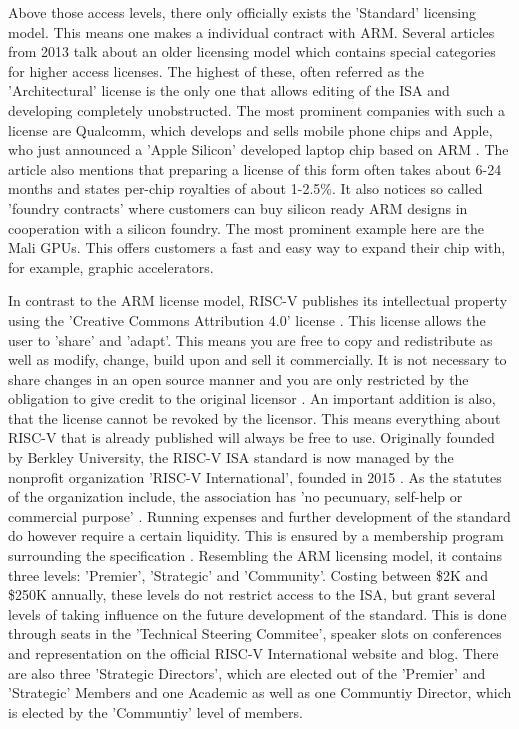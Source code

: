 \documentclass[conference]{IEEEtran}
\begin{document}
	Above those access levels, there only officially exists the 'Standard' licensing model. This means one makes a individual contract with ARM.
	Several articles from 2013 \cite{Demerjian2013}\cite{Demerjian2013a} talk about an older licensing model which contains special categories for higher access licenses. The highest of these, often referred as the 'Architectural' license is the only one that allows editing of the \gls{ISA} and developing completely unobstructed. The most prominent companies with such a license are Qualcomm, which develops and sells mobile phone chips and Apple, who just announced a 'Apple Silicon' developed laptop chip based on ARM \cite{Apple2020}. The article also mentions that preparing a license of this form often takes about 6-24 months and states per-chip royalties of about 1-2.5\%. It also notices so called 'foundry contracts' where customers can buy silicon ready ARM designs in cooperation with a silicon foundry. The most prominent example here are the Mali GPUs. This offers customers a fast and easy way to expand their chip with, for example, graphic accelerators.

	In contrast to the ARM license model, RISC-V publishes its intellectual property using the 'Creative Commons Attribution 4.0' license \cite{Waterman2017}\cite{Waterman2017a}. This license allows the user to 'share' and 'adapt'. This means you are free to copy and redistribute as well as modify, change, build upon and sell it commercially. It is not necessary to share changes in an open source manner and you are only restricted by the obligation to give credit to the original licensor \cite{CC}. An important addition is also, that the license cannot be revoked by the licensor. This means everything about RISC-V that is already published will always be free to use.
	Originally founded by Berkley University, the RISC-V \gls{ISA} standard is now managed by the nonprofit organization 'RISC-V International', founded in 2015 \cite{RVIAbout}. As the statutes of the organization include, the association has 'no pecunuary, self-help or commercial purpose' \cite{RVIArt}. Running expenses and further development of the standard do however require a certain liquidity. This is ensured by a membership program surrounding the specification \cite{RVIMem}. Resembling the ARM licensing model, it contains three levels: 'Premier', 'Strategic' and 'Community'. Costing between \$2K and \$250K annually, these levels do not restrict access to the \gls{ISA}, but grant several levels of taking influence on the future development of the standard. This is done through seats in the 'Technical Steering Commitee', speaker slots on conferences and representation on the official RISC-V International website and blog. There are also three 'Strategic Directors', which are elected out of the 'Premier' and 'Strategic' Members and one Academic as well as one Communtiy Director, which is elected by the 'Communtiy' level of members. \cite{RVIAss}
\end{document}
